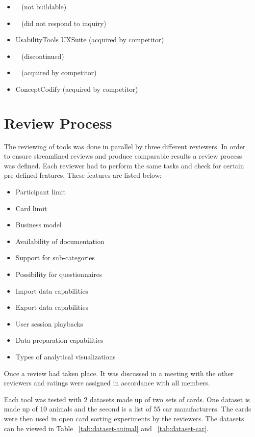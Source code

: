 \begin{itemize}
    \item ~\parencite{SortIt} (not buildable)
    \item ~\parencite{UserZoom} (did not respond to inquiry)
    \item UsabilityTools UXSuite (acquired by competitor)
    \item ~\parencite{SimpleCardSort} (discontinued)
    \item ~\parencite{usabiliTest} (acquired by competitor)
    \item ConceptCodify (acquired by competitor)
\end{itemize}


\section{Review Process} The reviewing of tools was done in parallel
by three different  reviewers. In order to ensure streamlined reviews
and produce comparable results a review process was defined. Each
reviewer had to perform the same tasks and check for certain
pre-defined features. These features are listed below:

\begin{itemize}
    \item Participant limit
    \item Card limit
    \item Business model
    \item Availability of documentation
    \item Support for sub-categories
    \item Possibility for questionnaires
    \item Import data capabilities
    \item Export data capabilities
    \item User session playbacks
    \item Data preparation capabilities
    \item Types of analytical visualizations
\end{itemize}

Once a review had taken place. It was discussed
in a meeting with the other reviewers and ratings were assigned in
accordance with all members.

Each tool was tested with 2 datasets made up of two sets of cards. One
dataset is made up of 10 animals and the second is a list of 55 car
manufacturers. The cards were then used in open card sorting
experiments by the reviewers. The datasets can be viewed in Table
~\ref{tab:dataset-animal} and ~\ref{tab:dataset-car}.

